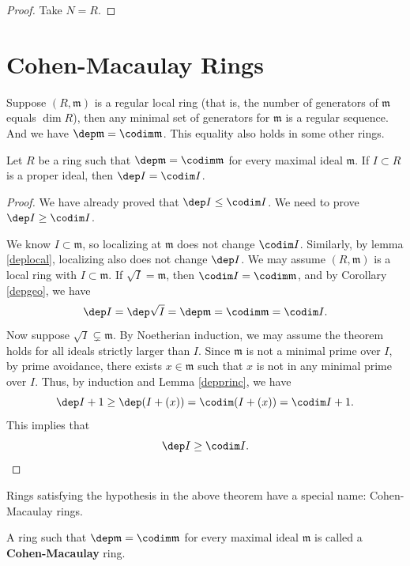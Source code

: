 \begin{proof}
    Take \(N=R\).
\end{proof}

\section{Cohen-Macaulay Rings}
Suppose \((R,\mathfrak{m})\) is a regular local ring (that is, the number of generators of \(\mathfrak{m}\) equals \(\dim R\)), then any minimal set of generators for \(\mathfrak{m}\) is a regular sequence. And we have \(\dep \mathfrak{m}=\codim \mathfrak{m}\). This equality also holds in some other rings.

\begin{theorem}
  Let \(R\) be a ring such that \(\dep \mathfrak{m}=\codim \mathfrak{m}\) for every maximal ideal \(\mathfrak{m}\). If \(I\subset R\) is a proper ideal, then \(\dep I=\codim I\).
\end{theorem}

\begin{proof}
    We have already proved that \(\dep I\leq \codim I\). We need to prove \(\dep I\geq \codim I\). 

    We know \(I\subset \mathfrak{m}\), so localizing at \(\mathfrak{m}\) does not change \(\codim I\). Similarly, by lemma \ref{deplocal}, localizing also does not change \(\dep I\). We may assume \((R,\mathfrak{m})\) is a local ring with \(I\subset \mathfrak{m}\). If \(\sqrt{I}=\mathfrak{m}\), then \(\codim I=\codim \mathfrak{m}\), and by Corollary \ref{depgeo}, we have 
    \[\dep I=\dep \sqrt{I}=\dep \mathfrak{m}=\codim \mathfrak{m}=\codim I.\]
    Now suppose \(\sqrt{I}\subsetneq \mathfrak{m}\). By Noetherian induction, we may assume the theorem holds for all ideals strictly larger than \(I\).  Since \(\mathfrak{m}\) is not a minimal prime over \(I\), by prime avoidance, there exists \(x\in \mathfrak{m}\) such that \(x\) is not in any minimal prime over \(I\). Thus, by induction and Lemma \ref{depprinc}, we have 
    \[\dep I+1\geq \dep(I+(x))=\codim (I+(x))=\codim I+1.\]
    This implies that 
    \[\dep I\geq \codim I.\]
\end{proof}

Rings satisfying the hypothesis in the above theorem have a special name: Cohen-Macaulay rings.

\begin{definition}
     A ring such that \(\dep \mathfrak{m}=\codim \mathfrak{m}\) for every maximal ideal \(\mathfrak{m}\) is called a \textbf{Cohen-Macaulay} ring. 
\end{definition}

